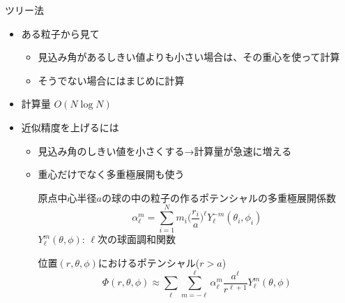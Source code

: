 
\begin{frame}[t,fragile]{ツリー法}
  \begin{itemize}
  \item ある粒子から見て
    \begin{itemize}
    \item 見込み角があるしきい値よりも小さい場合は、その重心を使って計算
    \item そうでない場合にはまじめに計算
    \end{itemize}
  \item 計算量 $O(N \log N)$
  \item 近似精度を上げるには
    \begin{itemize}
    \item 見込み角のしきい値を小さくする→計算量が急速に増える
    \item 重心だけでなく多重極展開も使う

      原点中心半径$a$の球の中の粒子の作るポテンシャルの多重極展開係数
      \[
      \alpha_\ell^m = \sum_{i=1}^{N} m_i \Big( \frac{r_i}{a} \Big)^\ell Y_\ell^{-m}(\theta_i, \phi_i)
      \]
      $Y_\ell^m(\theta,\phi)$: $\ell$次の球面調和関数

      位置$(r,\theta,\phi)$におけるポテンシャル($r>a$)
      \[
      \Phi(r,\theta,\phi) \approx \sum_\ell \sum_{m=-\ell}^{\ell} \alpha_\ell^m \frac{a^\ell}{r^{\ell+1}} Y_\ell^m(\theta,\phi)
      \]
      
    \end{itemize}
  \end{itemize}
\end{frame}

